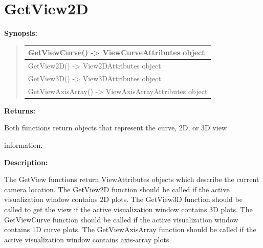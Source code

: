 \documentclass[letterpaper,10pt,english]{sphinxmanual}
\begin{document}
\section{GetView2D}
\label{functions:getview2d}
\begin{DUlineblock}{0em}
\item[] \textbf{Synopsis:}
\end{DUlineblock}
\begin{quote}

\begin{tabulary}{\linewidth}{|L|}
\hline

GetViewCurve() -\textgreater{} ViewCurveAttributes object
\\
\hline
GetView2D() -\textgreater{} View2DAttributes object
\\
\hline
GetView3D() -\textgreater{} View3DAttributes object
\\
\hline
GetViewAxisArray() -\textgreater{} ViewAxisArrayAttributes object
\\
\hline\end{tabulary}

\end{quote}

\begin{DUlineblock}{0em}
\item[] 
\item[] \textbf{Returns:}
\item[] Both functions return objects that represent the curve, 2D, or 3D view
\item[] information.
\item[] 
\item[] \textbf{Description:}
\item[] The GetView functions return ViewAttributes objects which describe the
current camera location. The GetView2D function should be called if the
active visualization window contains 2D plots. The GetView3D function
should be called to get the view if the active visualization window
contains 3D plots. The GetViewCurve function should be called if the active
visualization window contains 1D curve plots.  The GetViewAxisArray
function should be called if the active visualization window contains
axis-array plots.
\end{DUlineblock}

\begin{DUlineblock}{0em}
\item[] 
\end{DUlineblock}
\end{document}
